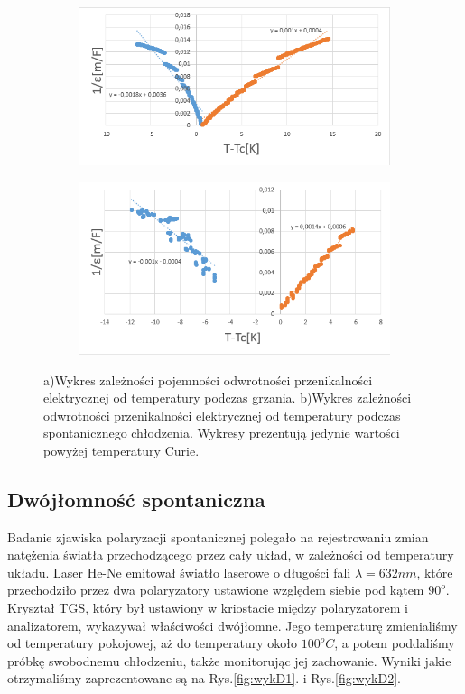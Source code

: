 \documentclass{article}
\begin{document}
\begin{figure}[h!]
  \centering
  \begin{subfigure}[b]{0.49\linewidth}
    \includegraphics[width=\linewidth]{wyk10.png}
    \caption{}
  \end{subfigure}
  \begin{subfigure}[b]{0.49\linewidth}
    \includegraphics[width=\linewidth]{wyk11.png}
    \caption{}
  \end{subfigure}
  \caption{a)Wykres zależności pojemności odwrotności przenikalności elektrycznej od temperatury podczas grzania. b)Wykres zależności odwrotności przenikalności elektrycznej od temperatury podczas spontanicznego chłodzenia. Wykresy prezentują jedynie wartości powyżej temperatury Curie.}
\label{fig:wyk1011}
\end{figure}

\subsection{Dwójłomność spontaniczna}

Badanie zjawiska polaryzacji spontanicznej polegało na rejestrowaniu zmian natężenia światła przechodzącego przez cały układ, w zależności od temperatury układu. Laser He-Ne emitował światło laserowe o długości fali $\lambda=632nm$, które przechodziło przez dwa polaryzatory ustawione względem siebie pod kątem $90^{o}$. Kryształ TGS, który był ustawiony w kriostacie między polaryzatorem i analizatorem, wykazywał właściwości dwójłomne. Jego temperaturę zmienialiśmy od temperatury pokojowej, aż do temperatury około $100^{o}C$, a potem poddaliśmy próbkę swobodnemu chłodzeniu, także monitorując jej zachowanie. Wyniki jakie otrzymaliśmy zaprezentowane są na Rys.\ref{fig:wykD1}. i Rys.\ref{fig:wykD2}.
\end{document}
